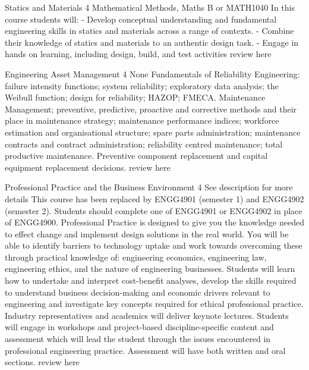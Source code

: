 	{Statics and Materials}
	{4}
	{Mathematical Methods, Maths B or MATH1040}
	{}
	{}
	{In this course students will: - Develop conceptual understanding and fundamental engineering skills in statics and materials across a range of contexts. - Combine their knowledge of statics and materials to an authentic design task. - Engage in hands on learning, including design, build, and test activities}
	{review here}

	{Engineering Asset Management}
	{4}
	{None}
	{}
	{}
	{Fundamentals of Reliability Engineering: failure intensity functions; system reliability; exploratory data analysis; the Weibull function; design for reliability; HAZOP; FMECA. Maintenance Management; preventive, predictive, proactive and corrective methods and their place in maintenance strategy; maintenance performance indices; workforce estimation and organisational structure; spare parts administration; maintenance contracts and contract administration; reliability centred maintenance; total productive maintenance. Preventive component replacement and capital equipment replacement decisions.}
	{review here}

	{Professional Practice and the Business Environment}
	{4}
	{See description for more details}
	{}
	{}
	{ This course has been replaced by ENGG4901 (semester 1) and ENGG4902 (semester 2). Students should complete one of ENGG4901 or ENGG4902 in place of ENGG4900. Professional Practice is designed to give you the knowledge needed to effect change and implement design solutions in the real world. You will be able to identify barriers to technology uptake and work towards overcoming these through practical knowledge of: engineering economics, engineering law, engineering ethics, and the nature of engineering businesses. Students will learn how to undertake and interpret cost-benefit analyses, develop the skills required to understand business decision-making and economic drivers relevant to engineering and investigate key concepts required for ethical professional practice. Industry representatives and academics will deliver keynote lectures. Students will engage in workshops and project-based discipline-specific content and assessment which will lead the student through the issues encountered in professional engineering practice. Assessment will have both written and oral sections.}
	{review here}

